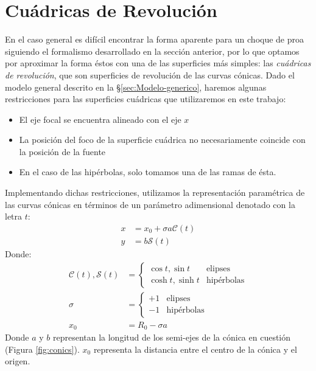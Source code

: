 \section{Cuádricas de Revolución}
\label{sec:quadrics}
\newcommand\Sin{\ensuremath{\mathcal{S}}}
\newcommand\Cos{\ensuremath{\mathcal{C}}}
\newcommand\Cot{\ensuremath{\mathcal{T}}}
\newcommand\Q{\ensuremath{\mathcal{Q}}}
\newcommand\fQi{\ensuremath{f_{\scriptscriptstyle \Q, i}}}
En el caso general es difícil encontrar la forma aparente para un choque de proa siguiendo el formalismo desarrollado en la sección anterior, por lo que optamos por aproximar la forma éstos con una de las superficies más simples: las \textit{cuádricas de revolución}, que son superficies de revolución de las curvas cónicas. Dado el modelo general descrito en la \S \ref{sec:Modelo-generico}, haremos algunas restricciones para las superficies cuádricas que utilizaremos en este trabajo:
\begin{itemize}
  \item El eje focal se encuentra alineado con el eje $x$
  \item La posición del foco de la superficie cuádrica no necesariamente coincide con la posición de la fuente
  \item En el caso de las hipérbolas, solo tomamos una de las ramas de ésta.
\end{itemize}
Implementando dichas restricciones, utilizamos la representación paramétrica de las curvas cónicas en términos de un parámetro adimensional denotado con la letra $t$:
\begin{align}
  x &= x_0 + \sigma a\Cos(t) \\
  y &= b\Sin(t) 
\end{align}
Donde:
\begin{align}
  \Cos(t), \Sin(t) &=\left\lbrace
  \begin{array}{lr}
    \cos{t}, \sin t & \mathrm{elipses}\\
    \cosh{t}, \sinh{t} & \mathrm{hipérbolas}       
  \end{array}\right. \\
  \sigma &= \left\lbrace
  \begin{array}{lr}
    +1 & \mathrm{elipses} \\
    -1 & \mathrm{hipérbolas}
  \end{array}\right. \\
  x_0 &= R_0 -\sigma a \label{eq:x0} 
\end{align}
Donde $a$ y $b$ representan la longitud de los semi-ejes de la cónica en cuestión (Figura \ref{fig:conics}). $x_0$ representa la distancia entre el centro de la cónica y el origen. 

